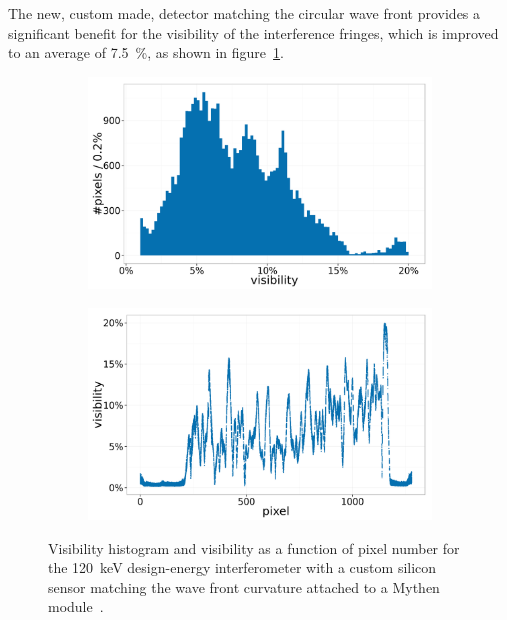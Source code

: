 The new, custom made, detector matching the circular wave front provides a
significant benefit for the visibility of the interference fringes, which is
improved to an average of \SI{7.5}{\percent}, as shown in
figure~\ref{fig:mythen-visibility}.

\begin{figure}[htb]
    \centering
    \begin{subfigure}[b]{.49\textwidth}
    \centering
    \includegraphics[width=\textwidth]{gfx/mythen-edge-on/visibility.png}
    \caption{}
    \label{fig:mythen-visibility}
    \end{subfigure}
    \hfill
    \begin{subfigure}[b]{.49\textwidth}
    \centering
    \includegraphics[width=\textwidth]{gfx/mythen-edge-on/pixel_visibility.png}
    \caption{}
    \label{fig:mythen-visibility-pixel}
    \end{subfigure}
    \caption[Visibility of the edge-on grating interferometer with a custom
    detector.]{Visibility histogram and visibility as a function of pixel
        number for the \SI{120}{\kilo\eV} design-energy interferometer with
        a custom silicon sensor matching the wave front curvature attached
        to a Mythen module~\parencite{SCHMITT2003267}.
    }
\end{figure}

